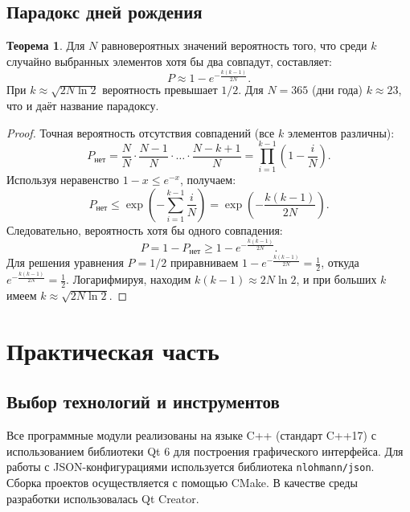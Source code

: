 \documentclass[a4paper]{article}
\theoremstyle{definition}
\newtheorem{theorem}{Теорема}[subsection]
\begin{document}
\subsection{Парадокс дней рождения}

\begin{theorem}
Для $N$ равновероятных значений вероятность того, что среди $k$ случайно выбранных элементов хотя бы два совпадут, составляет:
\begin{equation}
    P \approx 1 - e^{-\frac{k(k - 1)}{2N}}. \tag{32}
\end{equation}
При $k \approx \sqrt{2N \ln 2}$ вероятность превышает $1/2$. Для $N = 365$ (дни года) $k \approx 23$, что и даёт название парадоксу.
\end{theorem}

\begin{proof}
Точная вероятность отсутствия совпадений (все $k$ элементов различны):
\[
P_{\text{нет}} = \frac{N}{N} \cdot \frac{N-1}{N} \cdot \dots \cdot \frac{N-k+1}{N} = \prod_{i=1}^{k-1} \left(1 - \frac{i}{N}\right).
\]
Используя неравенство $1 - x \le e^{-x}$, получаем:
\[
P_{\text{нет}} \le \exp\left(-\sum_{i=1}^{k-1} \frac{i}{N}\right) = \exp\left(-\frac{k(k-1)}{2N}\right).
\]
Следовательно, вероятность хотя бы одного совпадения:
\[
P = 1 - P_{\text{нет}} \ge 1 - e^{-\frac{k(k-1)}{2N}}.
\]
Для решения уравнения $P = 1/2$ приравниваем $1 - e^{-\frac{k(k-1)}{2N}} = \frac12$, откуда $e^{-\frac{k(k-1)}{2N}} = \frac12$. Логарифмируя, находим $k(k-1) \approx 2N \ln 2$, и при больших $k$ имеем $k \approx \sqrt{2N \ln 2}$.
\end{proof}

\newpage

\section{Практическая часть}

\subsection{Выбор технологий и инструментов}

Все программные модули реализованы на языке C++ (стандарт C++17) с использованием библиотеки Qt 6 для построения графического интерфейса. Для работы с JSON-конфигурациями используется библиотека \texttt{nlohmann/json}. Сборка проектов осуществляется с помощью CMake. В качестве среды разработки использовалась Qt Creator.
\end{document}
